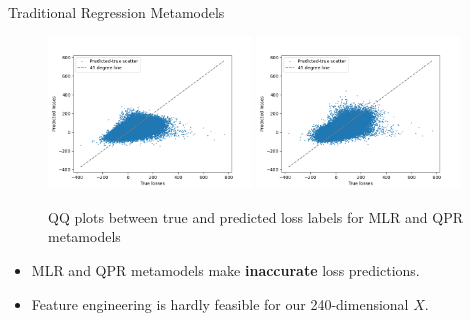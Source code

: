 \documentclass[9pt,handout]{beamer}
\begin{document}
\begin{frame}{Traditional Regression Metamodels}

    \begin{figure}[H]
        \includegraphics[width=0.48\textwidth]{../project2/figures/qqPlots/mlrLN.png}
        \includegraphics[width=0.48\textwidth]{../project2/figures/qqPlots/qprLN.png}
        \caption{QQ plots between true and predicted loss labels for MLR and QPR metamodels}
    \end{figure}

    \begin{itemize}
        \item   MLR and QPR metamodels make \textbf{inaccurate} loss predictions.
        \item   Feature engineering is hardly feasible for our 240-dimensional $X$.
    \end{itemize}

\end{frame}
\end{document}
